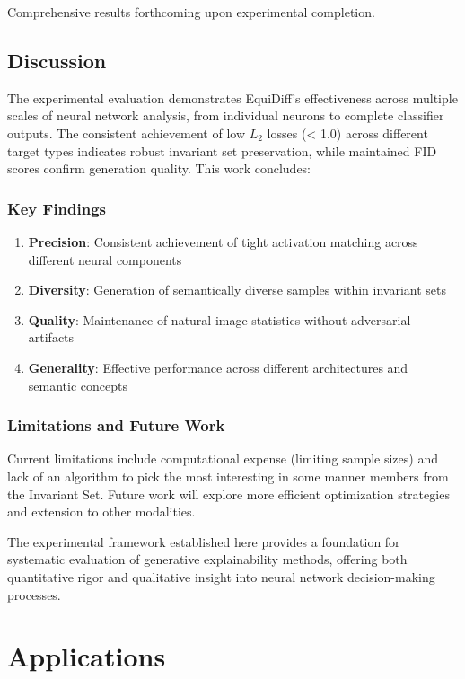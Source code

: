 \documentclass[licencjacka,en]{pracamgr}
\newcommand{\method}[1]{EquiDiff}  %
\begin{document}
Comprehensive results forthcoming upon experimental completion.

\section{Discussion}

The experimental evaluation demonstrates \method{}'s effectiveness across multiple scales of neural network analysis, from individual neurons to complete classifier outputs. The consistent achievement of low $L_2$ losses (< 1.0) across different target types indicates robust invariant set preservation, while maintained FID scores confirm generation quality. This work concludes:

\subsection{Key Findings}

\begin{enumerate}
\item \textbf{Precision}: Consistent achievement of tight activation matching across different neural components
\item \textbf{Diversity}: Generation of semantically diverse samples within invariant sets
\item \textbf{Quality}: Maintenance of natural image statistics without adversarial artifacts
\item \textbf{Generality}: Effective performance across different architectures and semantic concepts
\end{enumerate}

\subsection{Limitations and Future Work}

Current limitations include computational expense (limiting sample sizes) and lack of an algorithm to pick the most interesting in some manner members from the Invariant Set. Future work will explore more efficient optimization strategies and extension to other modalities.

The experimental framework established here provides a foundation for systematic evaluation of generative explainability methods, offering both quantitative rigor and qualitative insight into neural network decision-making processes.


\chapter{Applications}\label{r:applications}
\end{document}
